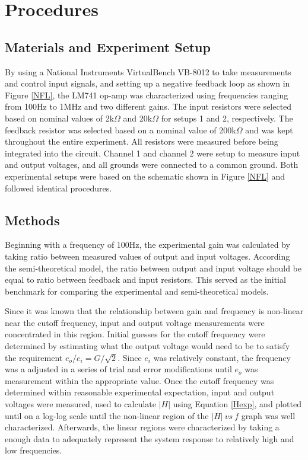 \documentclass[letterpaper,12pt]{article}
\begin{document}
\section{Procedures}
\subsection{Materials and Experiment Setup}
By using a National Instruments VirtualBench VB-8012 to take measurements and control input signals, and setting up a negative feedback loop as shown in Figure \ref{NFL}, the LM741 op-amp was characterized using frequencies ranging from 100Hz to 1MHz and two different gains. The input resistors were selected based on nominal values of 2k$\Omega$ and 20k$\Omega$ for setups 1 and 2, respectively. The feedback resistor was selected based on a nominal value of 200k$\Omega$ and was kept throughout the entire experiment. All resistors were measured before being integrated into the circuit. Channel 1 and channel 2 were setup to measure input and output voltages, and all grounds were connected to a common ground. Both experimental setups were based on the schematic shown in Figure \ref{NFL} and followed identical procedures. 

\subsection{Methods}
Beginning with a frequency of 100Hz, the experimental gain was calculated by taking ratio between measured values of output and input voltages. According the semi-theoretical model, the ratio between output and input voltage should be equal to ratio between feedback and input resistors. This served as the initial benchmark for comparing the experimental and semi-theoretical models.

Since it was known that the relationship between gain and frequency is non-linear near the cutoff frequency, input and output voltage measurements were concentrated in this region. Initial guesses for the cutoff frequency were determined by estimating what the output voltage would need to be to satisfy the requirement $e_o/e_i = G/\sqrt{2}$. Since $e_i$ was relatively constant, the frequency was a adjusted in a series of trial and error modifications until $e_o$ was measurement within the appropriate value. Once the cutoff frequency was determined within reasonable experimental expectation, input and output voltages were measured, used to calculate $|H|$ using Equation \ref{Hexp}, and plotted until on a log-log scale until the non-linear region of the $|H|\ vs\ f$ graph was well characterized. Afterwards, the linear regions were characterized by taking a enough data to adequately represent the system response to relatively high and low frequencies.
\end{document}
